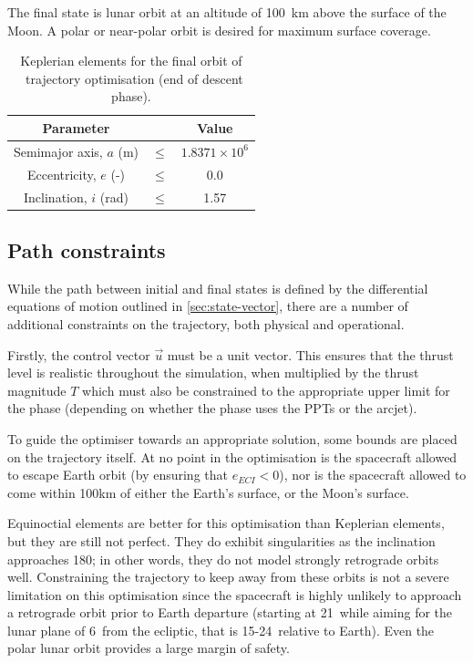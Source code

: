The final state is lunar orbit at an altitude of 100~km above the surface of the Moon. A polar or near-polar orbit is desired for maximum surface coverage.

\begin{table}[h]
\caption{Keplerian elements for the final orbit of \BW\ trajectory optimisation (end of descent phase).}
\label{tab:Phase-5-constraints}
\centering
\begin{tabular} {ccc}\toprule
Parameter && Value\\\midrule
Semimajor axis, $a$ (m) &$\le$& $1.8371\times 10^6$\\
Eccentricity, $e$ (-) &$\le$& 0.0\\
Inclination, $i$ (rad) &$\le$& 1.57\\\bottomrule
\end{tabular}
\end{table}

\subsection{Path constraints} \label{sub:Path-constraints}

While the path between initial and final states is defined by the differential equations of motion outlined in \autoref{sec:state-vector}, there are a number of additional constraints on the trajectory, both physical and operational.

Firstly, the control vector $\vec{u}$ must be a unit vector. This ensures that the thrust level is realistic throughout the simulation, when multiplied by the thrust magnitude $T$ which must also be constrained to the appropriate upper limit for the phase (depending on whether the phase uses the PPTs or the arcjet).

To guide the optimiser towards an appropriate solution, some bounds are placed on the trajectory itself. At no point in the optimisation is the spacecraft allowed to escape Earth orbit (by ensuring that $e_{ECI}<0$), nor is the spacecraft allowed to come within 100km of either the Earth's surface, or the Moon's surface.

Equinoctial elements are better for this optimisation than Keplerian elements, but they are still not perfect. They do exhibit singularities as the inclination approaches 180\degrees; in other words, they do not model strongly retrograde orbits well. Constraining the trajectory to keep away from these orbits is not a severe limitation on this optimisation since the spacecraft is highly unlikely to approach a retrograde orbit prior to Earth departure (starting at 21\degrees\ while aiming for the lunar plane of 6\degrees\ from the ecliptic, that is 15-24\degrees\ relative to Earth). Even the polar lunar orbit provides a large margin of safety.

